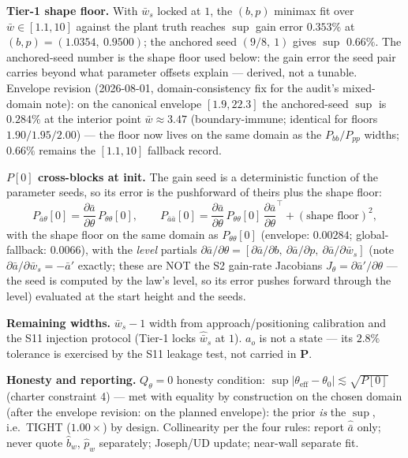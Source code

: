 \documentclass[11pt,a4paper,fontset=none]{ctexart}
\begin{document}
\textbf{Tier-1 shape floor.}  With $\bar{w}_s$ locked at $1$, the
$(b,p)$ minimax fit over $\bar{w}\in[1.1,10]$ against the plant truth
reaches $\sup$ gain error $0.353\%$ at $(b,p) = (1.0354,\ 0.9500)$; the
anchored seed $(9/8,\ 1)$ gives $\sup$ $0.66\%$.  The anchored-seed
number is the shape floor used below: the gain error the seed pair
carries beyond what parameter offsets explain --- derived, not a
tunable.  Envelope revision (2026-08-01, domain-consistency fix for the
audit's mixed-domain note): on the canonical envelope $[1.9, 22.3]$ the
anchored-seed $\sup$ is $0.284\%$ at the interior point
$\bar{w}\approx 3.47$ (boundary-immune; identical for floors
$1.90/1.95/2.00$) --- the floor now lives on the same domain as the
$P_{bb}/P_{pp}$ widths; $0.66\%$ remains the $[1.1,10]$ fallback
record.

\textbf{$P[0]$ cross-blocks at init.}  The gain seed is a deterministic
function of the parameter seeds, so its error is the pushforward of
theirs plus the shape floor:
\begin{equation*}
P_{\bar{a}\theta}[0] = \frac{\partial\bar{a}}{\partial\theta}\,
  P_{\theta\theta}[0],
\qquad
P_{\bar{a}\bar{a}}[0]
  = \frac{\partial\bar{a}}{\partial\theta}\,P_{\theta\theta}[0]\,
    \frac{\partial\bar{a}}{\partial\theta}^{\!\top}
  + (\text{shape floor})^2,
\end{equation*}
with the shape floor on the same domain as $P_{\theta\theta}[0]$
(envelope: $0.00284$; global-fallback: $0.0066$),
with the \emph{level} partials $\partial\bar{a}/\partial\theta =
[\partial\bar{a}/\partial b,\ \partial\bar{a}/\partial p,\
\partial\bar{a}/\partial\bar{w}_s]$ (note
$\partial\bar{a}/\partial\bar{w}_s = -\bar{a}'$ exactly; these are NOT
the S2 gain-rate Jacobians $J_\theta = \partial\bar{a}'/\partial\theta$
--- the seed is computed by the law's level, so its error pushes forward
through the level) evaluated at the start height and the seeds.

\textbf{Remaining widths.}  $\bar{w}_s-1$ width from
approach/positioning calibration and the S11 injection protocol (Tier-1
locks $\hat{\bar{w}}_s$ at $1$).  $a_o$ is not a state --- its $2.8\%$
tolerance is exercised by the S11 leakage test, not carried in
$\mathbf{P}$.

\textbf{Honesty and reporting.}  $Q_\theta = 0$ honesty condition:
$\sup|\theta_{\mathrm{eff}}-\theta_0| \lesssim \sqrt{P[0]}$ (charter
constraint 4) --- met with equality by construction on the chosen
domain (after the envelope revision: on the planned envelope): the
prior \emph{is} the $\sup$, i.e.\ TIGHT ($1.00\times$) by design.
Collinearity per the four rules: report $\hat{\bar{a}}$
only; never quote $\hat{b}_w$, $\hat{p}_w$ separately; Joseph/UD update;
near-wall separate fit.
\end{document}
